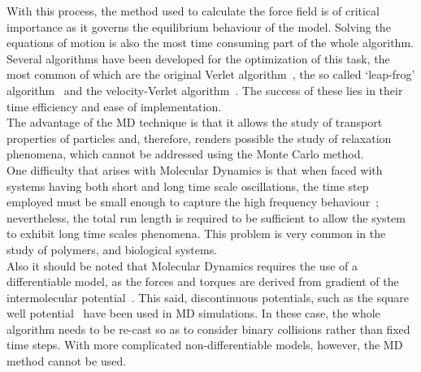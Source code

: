 With this process, the method used to calculate the force field is of critical importance as it
governs the equilibrium behaviour of the model. Solving the equations of motion is also the
most time consuming part of the whole algorithm. Several algorithms have been developed for the
optimization of this task, the most common of which are the original Verlet 
algorithm~\cite{verletForce}, the so called `leap-frog' algorithm~\cite{leapFrog} and the 
velocity-Verlet algorithm~\cite{velocityVerlet}. The success of these lies in their time 
efficiency and ease of implementation.\\
The advantage of the MD technique is that it allows the study of transport properties of particles
and, therefore, renders possible the study of relaxation phenomena, which cannot be addressed
using the Monte Carlo method.\\
One difficulty that arises with Molecular Dynamics is that when faced with systems having both short 
and long time scale oscillations, the time step employed must be small enough 
to capture the high frequency behaviour~; nevertheless, the total run length is required to be
sufficient to allow the system to exhibit long time
scales phenomena. This problem is very common in the study of polymers, and biological systems.\\
Also it should be noted that Molecular Dynamics requires the use of a differentiable model, as
the forces and torques are derived from gradient of the intermolecular
potential~\cite{AandT}. This said, discontinuous potentials, such as 
the square well potential~\cite{AlderWainwright59,AlderWainwright60} have been used in MD
simulations. In these case, the
whole algorithm needs to be re-cast so as to consider binary collisions rather than fixed
time steps. With more complicated non-differentiable models, however, the MD method cannot 
be used.



